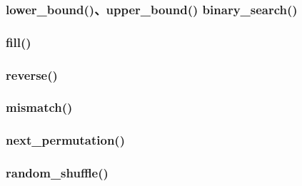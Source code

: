 \documentclass{article}
\begin{document}
\subsubsection{lower\_bound()、upper\_bound() binary\_search()}

\subsubsection{fill()}

\subsubsection{reverse()}

\subsubsection{mismatch()}

\subsubsection{next\_permutation()}

\subsubsection{random\_shuffle()}
\end{document}
